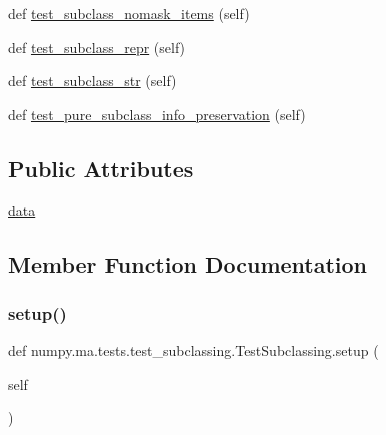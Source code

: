 \begin{DoxyCompactItemize}
\item 
def \hyperlink{classnumpy_1_1ma_1_1tests_1_1test__subclassing_1_1TestSubclassing_ac125a0bc329bd2e51b9b2178c9b35b28}{test\+\_\+subclass\+\_\+nomask\+\_\+items} (self)
\item 
def \hyperlink{classnumpy_1_1ma_1_1tests_1_1test__subclassing_1_1TestSubclassing_a54283c213437f4827e6a5af848b31983}{test\+\_\+subclass\+\_\+repr} (self)
\item 
def \hyperlink{classnumpy_1_1ma_1_1tests_1_1test__subclassing_1_1TestSubclassing_afc54f9790c9e343d2b720798f46fe416}{test\+\_\+subclass\+\_\+str} (self)
\item 
def \hyperlink{classnumpy_1_1ma_1_1tests_1_1test__subclassing_1_1TestSubclassing_a688a65061c6a5f3cdeaa5e2a0c98cad2}{test\+\_\+pure\+\_\+subclass\+\_\+info\+\_\+preservation} (self)
\end{DoxyCompactItemize}
\subsection*{Public Attributes}
\begin{DoxyCompactItemize}
\item 
\hyperlink{classnumpy_1_1ma_1_1tests_1_1test__subclassing_1_1TestSubclassing_a9d58fd17e1cde994a67f1f0f84f44add}{data}
\end{DoxyCompactItemize}


\subsection{Member Function Documentation}
\mbox{\label{classnumpy_1_1ma_1_1tests_1_1test__subclassing_1_1TestSubclassing_a548272c10838f40c8813fea31368477a}} 
\subsubsection{\texorpdfstring{setup()}{setup()}}
{\footnotesize\ttfamily def numpy.\+ma.\+tests.\+test\+\_\+subclassing.\+Test\+Subclassing.\+setup (\begin{DoxyParamCaption}\item[{}]{self }\end{DoxyParamCaption})}

